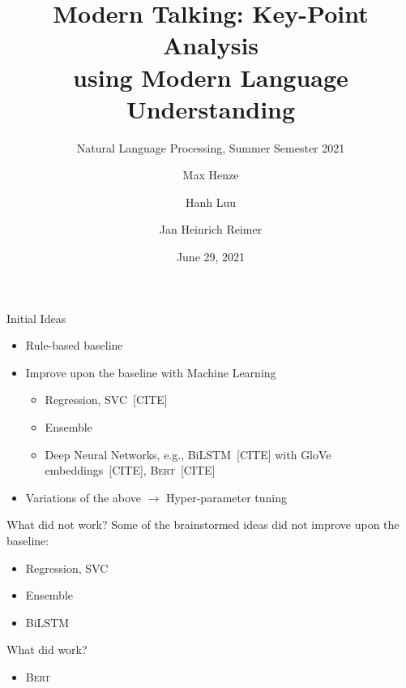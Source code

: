 \documentclass[english,handout]{mlutalk}
\title{%
  Modern Talking: Key-Point Analysis \\
  using Modern Language Understanding
}
\subtitle{Natural Language Processing, Summer Semester 2021}
\author{Max Henze \and Hanh Luu \and Jan Heinrich Reimer}
\institute{Martin Luther University Halle-Wittenberg}
\date{June 29, 2021}
\newcommand{\BiLSTM}{\mbox{BiLSTM}\xspace}
\newcommand{\Bert}{\textsc{Bert}\xspace}
\newcommand{\todocite}{{\smaller\color{red}[CITE]}\xspace}
\begin{document}
\titleframe

\begin{frame}{Initial Ideas}
  
  \begin{itemize}
    \item Rule-based baseline
    \item Improve upon the baseline with Machine Learning
    \begin{itemize}
      \item Regression, SVC~\todocite
      \item Ensemble
      \item Deep Neural Networks, e.g., \BiLSTM~\todocite with GloVe embeddings~\todocite, \Bert~\todocite
    \end{itemize}
    \item Variations of the above \(\to\) Hyper-parameter tuning
  \end{itemize}
  
  \begin{block}{What did not work?}
    Some of the brainstormed ideas did not improve upon the baseline:
    \begin{itemize}
      \item Regression, SVC
      \item Ensemble
      \item \BiLSTM
    \end{itemize}
  \end{block}
  
  \begin{block}{What did work?}
    \begin{itemize}
      \item \Bert
    \end{itemize}
  \end{block}

\end{frame}
\end{document}
